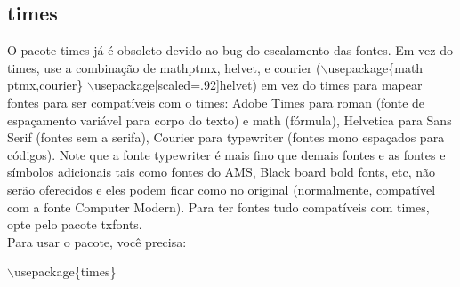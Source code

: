 \documentclass[12pt]{article}
\begin{document}
		\subsection{times}
			O pacote times já é obsoleto devido ao bug do escalamento das fontes. Em vez do times, use a combinação de mathptmx, helvet, e courier ($\backslash$usepackage\{{math\\ptmx,courier}\} $\backslash$usepackage[scaled=.92]{helvet}) em vez do times para mapear fontes para ser compatíveis com o times: Adobe Times para roman (fonte de espaçamento variável para corpo do texto) e  math (fórmula), Helvetica para Sans Serif (fontes sem a serifa), Courier para typewriter (fontes mono espaçados para códigos). Note que a fonte typewriter é mais fino que demais fontes e as fontes e símbolos adicionais tais como fontes do AMS, Black board bold fonts, etc, não serão oferecidos e eles podem ficar como no original (normalmente, compatível com a fonte Computer Modern).  Para ter fontes tudo compatíveis com times, opte pelo pacote txfonts.\\
			Para usar o pacote, você precisa:\\
		
			\begin{center}
				$\backslash$usepackage\{{times}\}
			\end{center}
		
		
	
\end{document}
